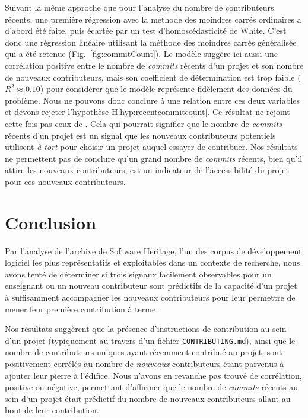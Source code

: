 \documentclass[dvipsnames,runningheads]{llncs}
\newcommand{\en}[1]{\foreignlanguage{english}{\emph{#1}}}
\begin{document}
    Suivant la même approche que pour l'analyse du nombre de contributeurs récents, une première régression
    avec la méthode des moindres carrés ordinaires a d'abord été faite, puis écartée par un test
    d'homoscédasticité de White. C'est donc une régression linéaire utilisant la méthode des moindres carrés
    généralisée qui a été retenue (Fig.~\ref{fig:commitCount}). Le modèle suggère ici aussi une corrélation
    positive entre le nombre de \en{commits} récents d'un projet et son nombre de nouveaux contributeurs, mais
    son coefficient de détermination est trop faible ($R^2 \approx 0.10$) pour considérer que le modèle
    représente fidèlement des données du problème. Nous ne pouvons donc conclure à une relation entre ces deux
    variables et devons rejeter \hyperref[hyp:recentcommitcount]{l'hypothèse H\ref*{hyp:recentcommitcount}}.
    Ce résultat ne rejoint cette fois pas ceux de \textcite[p.~13,16]{signals-2019}. Cela qui pourrait
    signifier que le nombre de \en{commits} récents d'un projet est un signal que les nouveaux
    contributeurs potentiels utilisent \emph{à tort} pour choisir un projet auquel essayer de contribuer. Nos
    résultats ne permettent pas de conclure qu'un grand nombre de \en{commits} récents, bien qu'il attire les
    nouveaux contributeurs, est un indicateur de l'accessibilité du projet pour ces nouveaux contributeurs.

    \section{Conclusion}

    Par l'analyse de l'archive de Software Heritage, l'un des corpus de développement logiciel les plus
    représentatifs et exploitables dans un contexte de recherche, nous avons tenté de déterminer si trois
    signaux facilement observables pour un enseignant ou un nouveau contributeur sont prédictifs de la
    capacité d'un projet à suffisamment accompagner les nouveaux contributeurs pour leur permettre de mener
    leur première contribution à terme.

    Nos résultats suggèrent que la présence d'instructions de contribution au sein d'un projet (typiquement au
    travers d'un fichier \texttt{CONTRIBUTING.md}), ainsi que le nombre de contributeurs uniques ayant
    récemment contribué au projet, sont positivement corrélés au nombre de \emph{nouveaux} contributeurs étant
    parvenus à ajouter leur pierre à l'édifice. Nous n'avons en revanche pas trouvé de corrélation, positive
    ou négative, permettant d'affirmer que le nombre de \en{commits} récents au sein d'un projet était
    prédictif du nombre de nouveaux contributeurs allant au bout de leur contribution.
\end{document}
